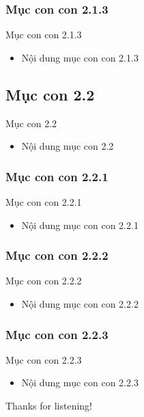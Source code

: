\documentclass{beamer}
\begin{document}
\subsubsection{Mục con con 2.1.3}
\begin{frame}{Mục con con 2.1.3}
    \begin{itemize}
        \item Nội dung mục con con 2.1.3
    \end{itemize}
\end{frame}

\subsection{Mục con 2.2}
\begin{frame}{Mục con 2.2}
    \begin{itemize}
        \item Nội dung mục con 2.2
    \end{itemize}
\end{frame}

\subsubsection{Mục con con 2.2.1}
\begin{frame}{Mục con con 2.2.1}
    \begin{itemize}
        \item Nội dung mục con con 2.2.1
    \end{itemize}
\end{frame}

\subsubsection{Mục con con 2.2.2}
\begin{frame}{Mục con con 2.2.2}
    \begin{itemize}
        \item Nội dung mục con con 2.2.2
    \end{itemize}
\end{frame}

\subsubsection{Mục con con 2.2.3}
\begin{frame}{Mục con con 2.2.3}
    \begin{itemize}
        \item Nội dung mục con con 2.2.3
    \end{itemize}
\end{frame}



\begin{frame}{}
\centering
\Huge{Thanks for listening!}
\end{frame}
\end{document}
